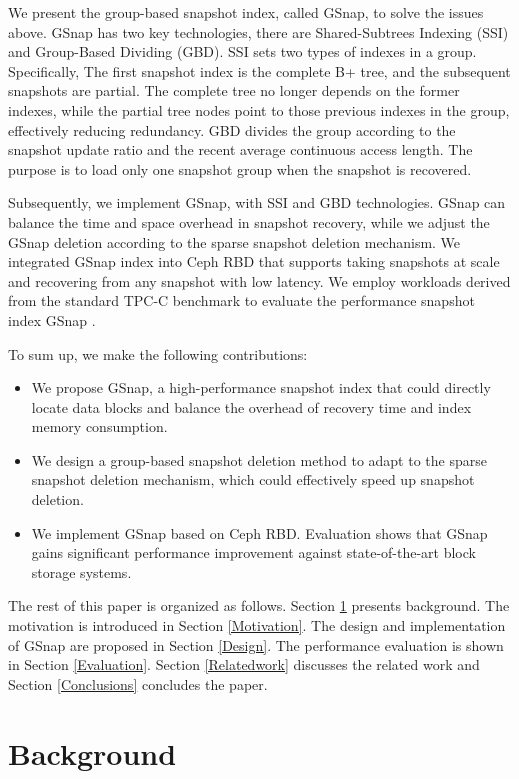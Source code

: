 \documentclass[sigconf, nonacm]{acmart}
\begin{document}
We present the group-based snapshot index, called GSnap, to solve the issues above. GSnap has two key technologies, there are Shared-Subtrees Indexing (SSI) and
Group-Based Dividing (GBD). SSI sets two types of indexes in a group. Specifically, The first snapshot index is the complete B+ tree, and the subsequent snapshots are partial. The complete tree no longer depends on the former indexes, while the partial tree nodes point to those previous indexes in the group, effectively reducing redundancy.
GBD divides the group according to the snapshot update ratio and the recent average continuous access length. 
The purpose is to load only one snapshot group when the snapshot is recovered.

Subsequently, we implement GSnap, with SSI and GBD technologies.
GSnap can balance the time and space overhead in snapshot recovery, while we adjust the GSnap deletion according to the sparse snapshot deletion mechanism.
We integrated GSnap index into Ceph RBD that supports taking snapshots at scale and recovering from any snapshot with low latency. We employ workloads derived from the standard TPC-C benchmark to evaluate the performance snapshot index GSnap . 


To sum up, we make the following contributions:
\begin{itemize}
	\item We propose GSnap, a high-performance snapshot index that could directly locate data blocks and balance the overhead of recovery time and index memory consumption.
	\item We design a group-based snapshot deletion method to adapt to the sparse snapshot deletion mechanism, which could effectively speed up snapshot deletion.
	\item We implement GSnap based on Ceph RBD. Evaluation shows that GSnap gains significant performance improvement against state-of-the-art block storage systems.
\end{itemize}

The rest of this paper is organized as follows. Section \ref{Background} presents background. The motivation is introduced in Section \ref{Motivation}. The design and implementation of GSnap are proposed in Section \ref{Design}. The performance evaluation is shown in Section \ref{Evaluation}. Section \ref{Relatedwork} discusses the related work and Section \ref{Conclusions} concludes the paper.

\section{Background}
\label{Background}
\end{document}
